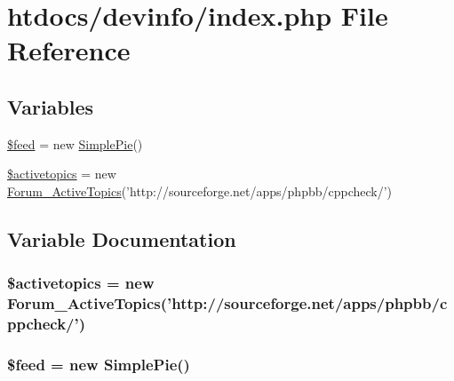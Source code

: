\hypertarget{devinfo_2index_8php}{\section{htdocs/devinfo/index.php File Reference}
\label{devinfo_2index_8php}
}
\subsection*{Variables}
\begin{DoxyCompactItemize}
\item 
\hyperlink{devinfo_2index_8php_a0c64e1f194986e6f51a67a8144fa305f}{\$feed} = new \hyperlink{class_simple_pie}{Simple\-Pie}()
\item 
\hyperlink{devinfo_2index_8php_ab9b9e14d3091f6ea25caa7214a85ce0d}{\$activetopics} = new \hyperlink{class_forum___active_topics}{Forum\-\_\-\-Active\-Topics}('http\-://sourceforge.\-net/apps/phpbb/cppcheck/')
\end{DoxyCompactItemize}


\subsection{Variable Documentation}
\hypertarget{devinfo_2index_8php_ab9b9e14d3091f6ea25caa7214a85ce0d}{
\subsubsection[{\$activetopics}]{\setlength{\rightskip}{0pt plus 5cm}\$activetopics = new {\bf Forum\-\_\-\-Active\-Topics}('http\-://sourceforge.\-net/apps/phpbb/cppcheck/')}}\label{devinfo_2index_8php_ab9b9e14d3091f6ea25caa7214a85ce0d}
\hypertarget{devinfo_2index_8php_a0c64e1f194986e6f51a67a8144fa305f}{
\subsubsection[{\$feed}]{\setlength{\rightskip}{0pt plus 5cm}\$feed = new {\bf Simple\-Pie}()}}\label{devinfo_2index_8php_a0c64e1f194986e6f51a67a8144fa305f}
